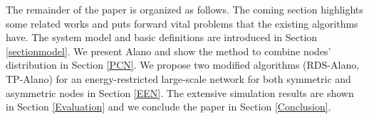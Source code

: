 The remainder of the paper is organized as follows. The coming section highlights some related works and puts forward vital problems that the existing algorithms have. The system model and basic definitions are introduced in Section \ref{sectionmodel}. We present Alano and show the method to combine nodes' distribution in Section \ref{PCN}. We propose two modified algorithms (RDS-Alano, TP-Alano) for an energy-restricted large-scale network for both symmetric and asymmetric nodes in Section \ref{EEN}. The extensive simulation results are shown in Section \ref{Evaluation} and we conclude the paper in Section \ref{Conclusion}.

